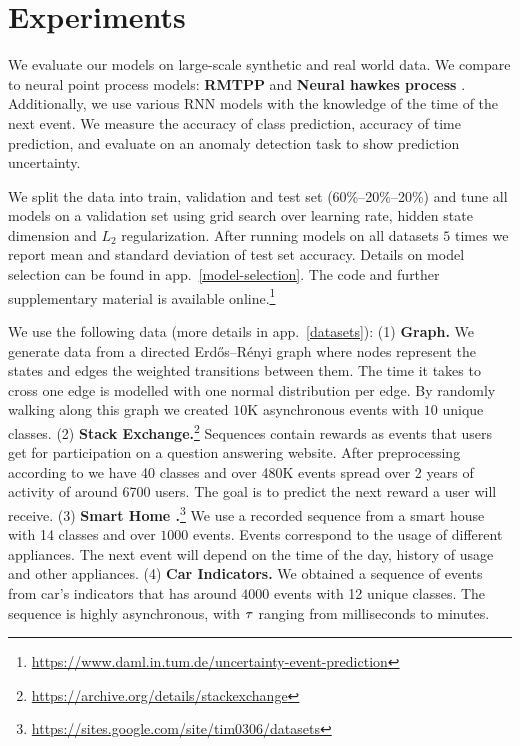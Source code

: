 \section{Experiments}
\label{sec:experiments_010}

We evaluate our models on large-scale synthetic and real world data. We compare to neural point process models: \textbf{RMTPP} \cite{RMTPP} and \textbf{Neural hawkes process} \cite{hawkes}. Additionally, we use various RNN models with the knowledge of the time of the next event. We measure the accuracy of class prediction, accuracy of time prediction, and evaluate on an anomaly detection task to show prediction uncertainty.

We split the data into train, validation and test set (60\%--20\%--20\%) and tune all models on a validation set using grid search over learning rate, hidden state dimension and $L_2$ regularization. After running models on all datasets $5$ times we report mean and standard deviation of test set accuracy. Details on model selection can be found in app.~\ref{model-selection}. The code and further supplementary material is available online.\footnote{\url{https://www.daml.in.tum.de/uncertainty-event-prediction}}

We use the following data (more details in app.~\ref{datasets}): (1) \textbf{Graph.} We generate data from a directed Erdős–Rényi graph where nodes represent the states and edges the weighted transitions between them. The time it takes to cross one edge is modelled with one normal distribution per edge. By randomly walking along this graph we created $10$K asynchronous events with $10$ unique classes.
(2) \textbf{Stack Exchange.}\footnote{\url{https://archive.org/details/stackexchange}} Sequences contain rewards as events that users get for participation on a question answering website. After preprocessing according to \cite{RMTPP} we have 40 classes and over 480K events spread over 2 years of activity of around 6700 users. The goal is to predict the next reward a user will receive.
(3) \textbf{Smart Home \normalfont\cite{SmartHome}.}\footnote{\url{https://sites.google.com/site/tim0306/datasets}} We use a recorded sequence from a smart house with 14 classes and over $1000$ events. Events correspond to the usage of different appliances. The next event will depend on the time of the day, history of usage and other appliances.
(4) \textbf{Car Indicators.} We obtained a sequence of events from car's indicators that has around $4000$ events with 12 unique classes. The sequence is highly asynchronous, with $\tau$ ranging from milliseconds to minutes.

\label{visualization}

\label{event_prediction}

\label{time_prediction}

\label{anomaly_detection}
